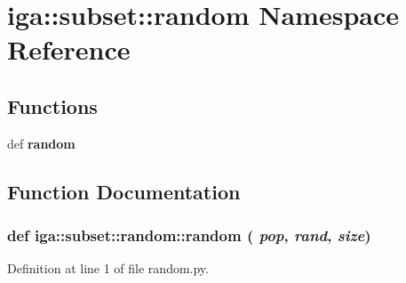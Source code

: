 \section{iga::subset::random Namespace Reference}
\label{namespaceiga_1_1subset_1_1random}


\subsection*{Functions}
\begin{CompactItemize}
\item 
def {\bf random}
\end{CompactItemize}


\subsection{Function Documentation}
\subsubsection{\setlength{\rightskip}{0pt plus 5cm}def iga::subset::random::random ( {\em pop},  {\em rand},  {\em size})}\label{namespaceiga_1_1subset_1_1random_6f2fcae73826b851f1acdb89e9d9693a}




Definition at line 1 of file random.py.